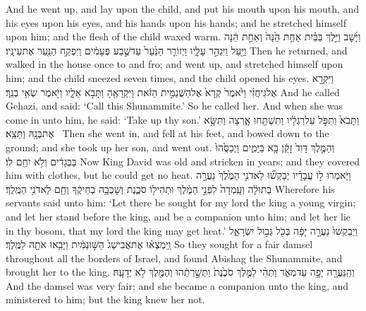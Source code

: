 {And he went up, and lay upon the child, and put his mouth upon his mouth, and his eyes upon his eyes, and his hands upon his hands; and he stretched himself upon him; and the flesh of the child waxed warm.}
{וַיָּ֜שׇׁב וַיֵּ֣לֶךְ בַּבַּ֗יִת אַחַ֥ת הֵ֙נָּה֙ וְאַחַ֣ת הֵ֔נָּה וַיַּ֖עַל וַיִּגְהַ֣ר עָלָ֑יו וַיְזוֹרֵ֤ר הַנַּ֙עַר֙ עַד\maqqaf שֶׁ֣בַע פְּעָמִ֔ים וַיִּפְקַ֥ח הַנַּ֖עַר אֶת\maqqaf עֵינָֽיו׃}
{Then he returned, and walked in the house once to and fro; and went up, and stretched himself upon him; and the child sneezed seven times, and the child opened his eyes.}
{וַיִּקְרָ֣א אֶל\maqqaf גֵּיחֲזִ֗י וַיֹּ֙אמֶר֙ קְרָא֙ אֶל\maqqaf הַשֻּׁנַמִּ֣ית הַזֹּ֔את וַיִּקְרָאֶ֖הָ וַתָּבֹ֣א אֵלָ֑יו וַיֹּ֖אמֶר שְׂאִ֥י בְנֵֽךְ׃}
{And he called Gehazi, and said: ‘Call this Shunammite.’ So he called her. And when she was come in unto him, he said: ‘Take up thy son.’}
{וַתָּבֹא֙ וַתִּפֹּ֣ל עַל\maqqaf רַגְלָ֔יו וַתִּשְׁתַּ֖חוּ אָ֑רְצָה וַתִּשָּׂ֥א אֶת\maqqaf בְּנָ֖הּ וַתֵּצֵֽא׃ \petucha }
{Then she went in, and fell at his feet, and bowed down to the ground; and she took up her son, and went out.}
\label{haft_5}
\setcounter{chap}{1}
\setcounter{verse}{1}
{וְהַמֶּ֤לֶךְ דָּוִד֙ זָקֵ֔ן בָּ֖א בַּיָּמִ֑ים וַיְכַסֻּ֙הוּ֙ בַּבְּגָדִ֔ים וְלֹ֥א יִחַ֖ם לֽוֹ׃}
{Now King David was old and stricken in years; and they covered him with clothes, but he could get no heat.}
{וַיֹּ֧אמְרוּ ל֣וֹ עֲבָדָ֗יו יְבַקְשׁ֞וּ לַאדֹנִ֤י הַמֶּ֙לֶךְ֙ נַעֲרָ֣ה בְתוּלָ֔ה וְעָֽמְדָה֙ לִפְנֵ֣י הַמֶּ֔לֶךְ וּתְהִי\maqqaf ל֖וֹ סֹכֶ֑נֶת וְשָׁכְבָ֣ה בְחֵיקֶ֔ךָ וְחַ֖ם לַאדֹנִ֥י הַמֶּֽלֶךְ׃}
{Wherefore his servants said unto him: ‘Let there be sought for my lord the king a young virgin; and let her stand before the king, and be a companion unto him; and let her lie in thy bosom, that my lord the king may get heat.’}
{וַיְבַקְשׁוּ֙ נַעֲרָ֣ה יָפָ֔ה בְּכֹ֖ל גְּב֣וּל יִשְׂרָאֵ֑ל וַֽיִּמְצְא֗וּ אֶת\maqqaf אֲבִישַׁג֙ הַשּׁ֣וּנַמִּ֔ית וַיָּבִ֥אוּ אֹתָ֖הּ לַמֶּֽלֶךְ׃}
{So they sought for a fair damsel throughout all the borders of Israel, and found Abishag the Shunammite, and brought her to the king.}
{וְהַֽנַּעֲרָ֖ה יָפָ֣ה עַד\maqqaf מְאֹ֑ד וַתְּהִ֨י לַמֶּ֤לֶךְ סֹכֶ֙נֶת֙ וַתְּשָׁ֣רְתֵ֔הוּ וְהַמֶּ֖לֶךְ לֹ֥א יְדָעָֽהּ׃}
{And the damsel was very fair; and she became a companion unto the king, and ministered to him; but the king knew her not.}
